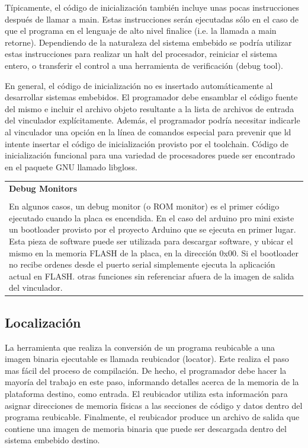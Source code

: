 \documentclass[output=paper, 
colorlinks,
citecolor=brown,
newtxmath
]{langscibook}
\begin{document}
Típicamente, el código de inicialización también incluye unas pocas
instrucciones después de llamar a main. Estas instrucciones serán ejecutadas
sólo en el caso de que el programa en el lenguaje de alto nivel finalice (i.e.
la llamada a main retorne). Dependiendo de la naturaleza del sistema embebido
se podría utilizar estas instrucciones para realizar un halt del procesador, 
reiniciar el sistema entero, o transferir el control a una herramienta
de verificación (debug tool).

En general, el código de inicialización no es insertado automáticamente al desarrollar sistemas embebidos. El
programador debe ensamblar el código fuente del mismo e incluir el archivo objeto resultante a la 
lista de archivos de entrada del vinculador explícitamente. Además, el programador
podría necesitar indicarle al vinculador una opción en la línea de comandos especial
para prevenir que ld intente insertar el código de inicialización provisto
por el toolchain.
Código de inicialización funcional para una variedad de procesadores puede
ser encontrado en el paquete GNU llamado libgloss.


\begin{center}
\begin{tabularx}{\textwidth}{|X|}
\hline
\rowcolor{lightgray}
\textbf{Debug Monitors} \\ \\
En algunos casos, un debug monitor (o ROM monitor) es el primer código
ejecutado cuando la placa es encendida. En el caso del arduino pro mini
existe un bootloader provisto por el proyecto Arduino que se ejecuta en primer lugar.
Esta pieza de software puede ser utilizada
para descargar software, y ubicar el mismo en la memoria FLASH de la placa, en la dirección 0x00.
Si el bootloader no recibe ordenes desde el puerto serial simplemente ejecuta la aplicación
actual en FLASH.
otras funciones sin referenciar afuera de la imagen de salida
del vinculador.\\
\hline
\end{tabularx}
\end{center}


\subsection {Localización}

La herramienta que realiza la conversión de un programa reubicable a
una imagen binaria ejecutable es llamada reubicador (locator).
Este realiza el paso mas fácil del proceso de compilación. De hecho, 
el programador debe hacer la mayoría del trabajo en este paso, informando
detalles acerca de la memoria de la plataforma destino, como entrada.
El reubicador utiliza esta información para asignar direcciones
de memoria físicas a las secciones de código y datos dentro del programa
reubicable. Finalmente, el reubicador produce un archivo de salida que contiene
una imagen de memoria binaria que puede ser descargada dentro del sistema
embebido destino.
\end{document}

